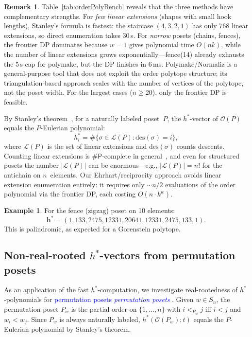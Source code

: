 \documentclass[11pt,reqno]{amsart}
\theoremstyle{definition}
\newtheorem{example}[theorem]{Example}
\newtheorem{remark}[theorem]{Remark}
\newcommand{\hvec}{\mathbf{h}^{*}}
\newcommand{\defin}[1]{%
\relax\ifmmode%
\textcolor{blue}{#1}%
\else \textcolor{blue}{\emph{#1}}%
\fi%
}
\begin{document}
\begin{remark}\label{rem:orderPolySpeedup}
Table~\ref{tab:orderPolyBench} reveals that the three methods have
complementary strengths.  For \emph{few linear extensions}
(shapes with small hook lengths), Stanley's formula is fastest: the
staircase $(4,3,2,1)$ has only 768 linear extensions, so direct
enumeration takes 30\,\textmu s.
For \emph{narrow} posets (chains, fences), the frontier DP dominates
because $w=1$ gives polynomial time $O(nk)$, while the number of
linear extensions grows exponentially---fence(14) already exhausts
the 5\,s cap for polymake, but the DP finishes in 6\,ms.
Polymake/Normaliz is a general-purpose tool that does not exploit
the order polytope structure; its triangulation-based approach
scales with the number of vertices of the polytope, not the
poset width.  For the largest cases ($n \geq 20$), only the
frontier DP is feasible.
\end{remark}

By Stanley's theorem~\cite[Thm.~4.5.14]{StanleyEC1},
for a naturally labeled poset~$P$, the $h^*$-vector of
$\mathcal{O}(P)$ equals the $P$-Eulerian polynomial:
\[
  h^*_i = \#\{\sigma \in \mathcal{L}(P) : \mathrm{des}(\sigma) = i\},
\]
where $\mathcal{L}(P)$ is the set of linear extensions and
$\mathrm{des}(\sigma)$ counts descents.
Counting linear extensions is $\#\mathsf{P}$-complete in
general~\cite{BrightwellWinkler1991}, and even for structured posets the
number $|\mathcal{L}(P)|$ can be enormous---e.g., $|\mathcal{L}(P)| = n!$
for the antichain on $n$~elements.  Our Ehrhart/reciprocity approach
avoids linear extension enumeration entirely: it requires only $\sim n/2$
evaluations of the order polynomial via the frontier DP, each costing
$O(n \cdot k^w)$.

\begin{example}\label{ex:fenceHstar}
For the fence (zigzag) poset on 10 elements:
\[
  \hvec = (1, 133, 2475, 12331, 20641, 12331, 2475, 133, 1).
\]
This is palindromic, as expected for a Gorenstein polytope.
\end{example}


\subsection{Non-real-rooted \texorpdfstring{$h^*$}{h*}-vectors from permutation posets}\label{subs:nonRR}

As an application of the fast $h^*$-computation, we investigate
real-rootedness of $h^*$-polynomials for \defin{permutation posets}.
Given $w \in S_n$, the permutation poset $P_w$ is the partial order
on $\{1,\dotsc,n\}$ with $i <_{P_w} j$ iff $i < j$ and $w_i < w_j$.
Since $P_w$ is always naturally labeled, $h^*(\mathcal{O}(P_w); t)$
equals the $P$-Eulerian polynomial by Stanley's theorem.
\end{document}
